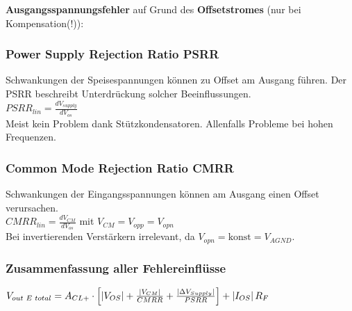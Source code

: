 			\begin{minipage}{18cm}
            	\vspace{3mm}
				\textbf{Ausgangsspannungsfehler} auf Grund des \textbf{Offsetstromes} (nur bei
				Kompensation(!)):
				\\
			\end{minipage}

		\subsubsection{Power Supply Rejection Ratio PSRR}
		Schwankungen der Speisespannungen können zu Offset am Ausgang führen.
		Der PSRR beschreibt Unterdrückung solcher Beeinflussungen. \bigskip \\
		$PSRR_{lin}=\frac{dV_{supply}}{dV_{os}}$ \bigskip \\
		Meist kein Problem dank Stützkondensatoren. 
		Allenfalls Probleme bei hohen Frequenzen.
		
		\subsubsection{Common Mode Rejection Ratio CMRR}
		Schwankungen der Eingangsspannungen können am Ausgang einen Offset verursachen. \bigskip \\
		$CMRR_{lin}=\frac{dV_{CM}}{dV_{os}}$ mit $V_{CM}=V_{opp}=V_{opn}$ \bigskip \\
		Bei invertierenden Verstärkern irrelevant, da $V_{opn}=\text{konst}=V_{AGND}$.

		\subsubsection{Zusammenfassung aller Fehlereinflüsse}
      $V_{out\hspace{1mm}E\hspace{1mm}total}=A_{CL+}\cdot\left[\left|V_{OS}\right|+\frac{\left|V_{CM}\right|}{CMRR}
            	+\frac{\left|\Delta V_{Supply}\right|}{PSRR}\right]+\left|I_{OS}\right|R_F$\\

